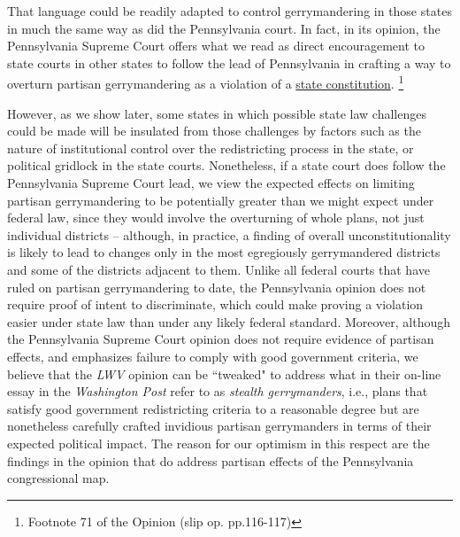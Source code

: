     That language could be readily adapted to control gerrymandering in those states in much the same way as did the Pennsylvania court. In fact, in its opinion, the Pennsylvania Supreme Court offers what we read as direct encouragement to state courts in other states to follow the lead of Pennsylvania in crafting a way to overturn partisan gerrymandering as a violation of a \underline{state constitution}.
        \footnote{Footnote 71 of the Opinion (slip op. pp.116-117)}
\par
    However, as we show later, some states in which possible state law challenges could be made will be insulated from those challenges by factors such as the nature of institutional control over the redistricting process in the state, or political gridlock in the state courts. Nonetheless, if a state court does follow the Pennsylvania Supreme Court lead, we view the expected effects on limiting partisan gerrymandering to be potentially greater than we might expect under federal law, since they would involve the overturning of whole plans, not just individual districts -- although, in practice, a finding of overall unconstitutionality is likely to lead to changes only in the most egregiously gerrymandered districts and some of the districts adjacent to them. Unlike all federal courts that have ruled on partisan gerrymandering to date, the Pennsylvania opinion does not require proof of intent to discriminate, which could make proving a violation easier under state law than under any likely federal standard. Moreover, although the Pennsylvania Supreme Court opinion does not require evidence of partisan effects, and emphasizes failure to comply with good government criteria, we believe that the \textit{LWV} opinion can be ``tweaked" to address what \citet{GrofmanCervas2018_WashPo} in their on-line essay in the \textit{Washington Post} refer to as \textit{stealth gerrymanders}, i.e., plans that satisfy good government redistricting criteria to a reasonable degree but are nonetheless carefully crafted invidious partisan gerrymanders in terms of their expected political impact. The reason for our optimism in this respect are the findings in the opinion that do address partisan effects of the Pennsylvania congressional map. 
